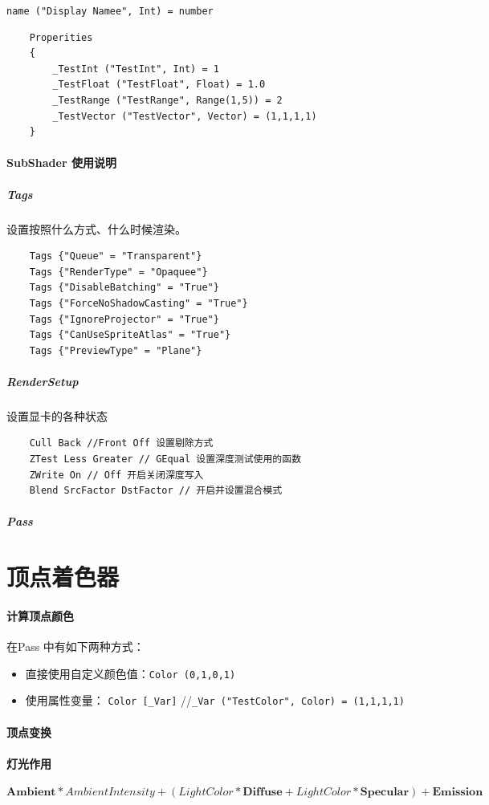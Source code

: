 \documentclass[UTF8,a4paper,12pt]{ctexbook}
\begin{document}
			\verb|name ("Display Namee", Int) = number|
			\begin{lstlisting}
	Properities
	{
		_TestInt ("TestInt", Int) = 1
		_TestFloat ("TestFloat", Float) = 1.0
		_TestRange ("TestRange", Range(1,5)) = 2
		_TestVector ("TestVector", Vector) = (1,1,1,1)
	}
			\end{lstlisting}
			
			
		\paragraph{SubShader 使用说明}
			\subparagraph{Tags}
				设置按照什么方式、什么时候渲染。
				\begin{lstlisting}
	Tags {"Queue" = "Transparent"}
	Tags {"RenderType" = "Opaquee"}
	Tags {"DisableBatching" = "True"}
	Tags {"ForceNoShadowCasting" = "True"}
	Tags {"IgnoreProjector" = "True"}	
	Tags {"CanUseSpriteAtlas" = "True"}
	Tags {"PreviewType" = "Plane"}
				\end{lstlisting}
			
			\subparagraph{RenderSetup}
				设置显卡的各种状态
				\begin{lstlisting}
	Cull Back //Front Off 设置剔除方式
	ZTest Less Greater // GEqual 设置深度测试使用的函数
	ZWrite On // Off 开启关闭深度写入
	Blend SrcFactor DstFactor // 开启并设置混合模式
				\end{lstlisting}
						
		
			\subparagraph{Pass}
			
			
		
		
	\section{顶点着色器}
		\paragraph{计算顶点颜色}
			在Pass 中有如下两种方式：
			\begin{itemize}
				\item 直接使用自定义颜色值：\verb|Color (0,1,0,1)|
				\item 使用属性变量： \verb|Color [_Var]| //\verb|_Var ("TestColor", Color) = (1,1,1,1)|
			\end{itemize}
		
		\paragraph{顶点变换}
		
		
		\paragraph{灯光作用}
			$$\mathbf{Ambient}*Ambient Intensity+ (Light Color * \mathbf{Diffuse} + Light  Color* \mathbf{Specular}) + \mathbf{Emission}$$
			
\end{document}
